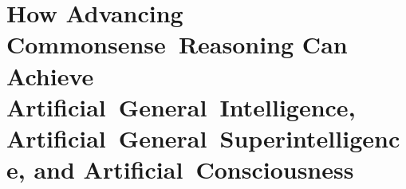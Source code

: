 \chapter{How Advancing Commonsense~Reasoning Can Achieve Artificial~General~Intelligence, Artificial~General~Superintelligence, and Artificial~Consciousness}
